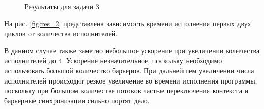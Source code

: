 \documentclass[a4paper,12pt]{article} %
\begin{document}
\begin{figure}[h!]
	\vspace{-10mm}
	\vspace{-5mm}
	\caption{Результаты для задачи 3}
	\label{fig:res_3}
\end{figure}

На рис. \ref{fig:res_2} представлена зависимость времени исполнения первых двух циклов от количества исполнителей.

В данном случае также заметно небольшое ускорение при увеличении количества исполнителей до 4.
Ускорение незначительное, поскольку необходимо использовать большой количество барьеров.
При дальнейшем увеличении числа исполнителей происходит резкое увеличение во времени исполнения программы,
поскольку при большом количестве потоков частые переключения контекста и барьерные синхронизации сильно портят дело.
\end{document}
